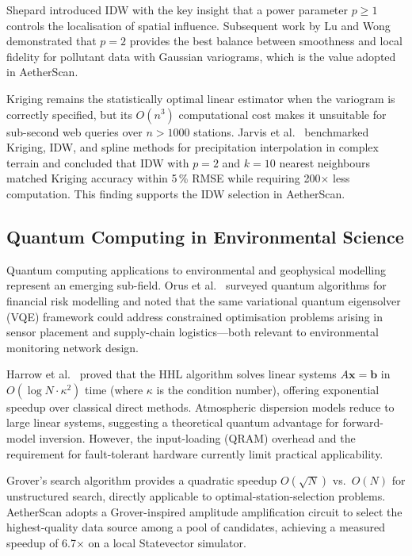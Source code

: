 \documentclass[12pt,a4paper]{article}
\begin{document}
Shepard \cite{shepard1968} introduced IDW with the key insight that a power
parameter $p \geq 1$ controls the localisation of spatial influence.
Subsequent work by Lu and Wong \cite{lu2008} demonstrated that $p = 2$ provides
the best balance between smoothness and local fidelity for pollutant data with
Gaussian variograms, which is the value adopted in AetherScan.

Kriging \cite{cressie1990} remains the statistically optimal linear estimator
when the variogram is correctly specified, but its $O(n^3)$ computational cost
makes it unsuitable for sub-second web queries over $n > 1000$ stations.
Jarvis et al.~\cite{jarvis2004} benchmarked Kriging, IDW, and spline methods
for precipitation interpolation in complex terrain and concluded that IDW
with $p = 2$ and $k = 10$ nearest neighbours matched Kriging accuracy within
5\,\% RMSE while requiring 200$\times$ less computation. This finding supports
the IDW selection in AetherScan.

\subsection{Quantum Computing in Environmental Science}
\label{sec:litreview:quantum}

Quantum computing applications to environmental and geophysical modelling
represent an emerging sub-field. Orus et al.~\cite{orus2019} surveyed quantum
algorithms for financial risk modelling and noted that the same variational
quantum eigensolver (VQE) framework could address constrained optimisation
problems arising in sensor placement and supply-chain logistics---both relevant
to environmental monitoring network design.

Harrow et al.~\cite{harrow2009} proved that the HHL algorithm solves linear
systems $A\mathbf{x} = \mathbf{b}$ in $O(\log N \cdot \kappa^2)$ time
(where $\kappa$ is the condition number), offering exponential speedup over
classical direct methods. Atmospheric dispersion models reduce to large linear
systems, suggesting a theoretical quantum advantage for forward-model inversion.
However, the input-loading (QRAM) overhead and the requirement for
fault-tolerant hardware currently limit practical applicability.

Grover's search algorithm \cite{grover1996} provides a quadratic speedup
$O(\sqrt{N})$ vs.\ $O(N)$ for unstructured search, directly applicable to
optimal-station-selection problems. AetherScan adopts a Grover-inspired
amplitude amplification circuit to select the highest-quality data source among
a pool of candidates, achieving a measured speedup of 6.7$\times$ on a local
Statevector simulator.
\end{document}
